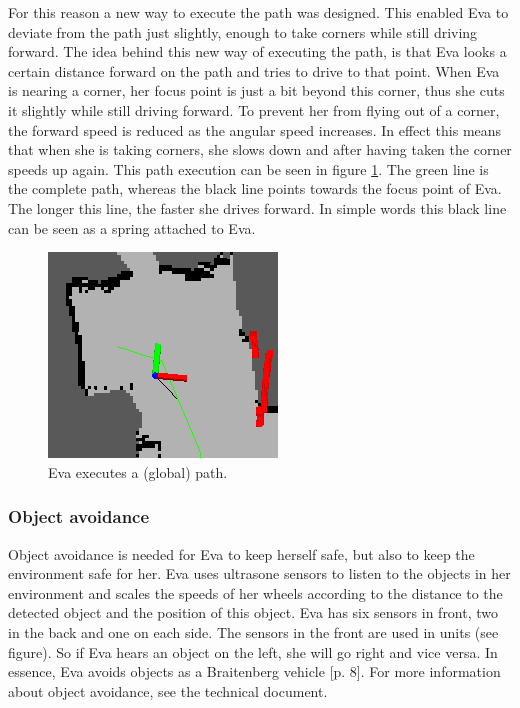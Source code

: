 \documentclass[project_eva.tex]{subfiles}
\begin{document}
For this reason a new way to execute the path was designed. This enabled Eva to deviate from the path just slightly, enough 
to take corners while still driving forward. The idea behind this new way of executing the path, is that Eva looks a 
certain distance forward on the path and tries to drive to that point. When Eva is nearing a corner, her focus point is 
just a bit beyond this corner, thus she cuts it slightly while still driving forward. To prevent her from flying out of a 
corner, the forward speed is reduced as the angular speed increases. In effect this means that when she is taking corners, 
she slows down and after having taken the corner speeds up again. This path execution can be seen in figure 
\ref{fig:global_path}. The green line is the complete path, whereas the black line points towards the focus point of Eva. 
The longer this line, the faster she drives forward. In simple words this black line can be seen as a spring attached to 
Eva.
\begin{figure}[ht!]
	\centering
	\mbox{\includegraphics[scale=0.4]{Images/global_path.png}}
	\caption{Eva executes a (global) path.}
	\label{fig:global_path}
\end{figure}

\subsubsection*{Object avoidance}
Object avoidance is needed for Eva to keep herself safe, but also to keep the environment safe for her. Eva uses ultrasone 
sensors to listen to the objects in her environment and scales the speeds of her wheels according to the distance to the 
detected object and the position of this object. Eva has six sensors in front, two in the back and one on each side. The 
sensors in the front are used in units (see figure). So if Eva hears an object on the left, she will go right and vice 
versa. In essence, Eva avoids objects as a Braitenberg vehicle 
\cite{braitenberg} [p. 8]. For more information about object avoidance, see the 
technical document.
\end{document}
